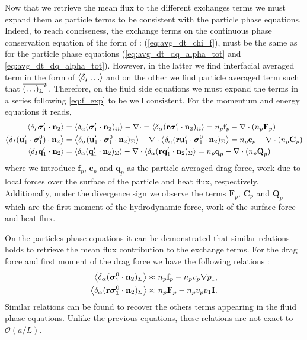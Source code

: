 Now that we retrieve the mean flux to the different exchanges terms we must expand them as particle terms to be consistent with the particle phase equations. 
Indeed, to reach conciseness, the exchange terms on the continuous phase conservation equation of the form of : (\ref{eq:avg_dt_chi_f}), must be the same as for the particle phase equations (\ref{eq:avg_dt_dq_alpha_tot} and \ref{eq:avg_dt_dq_alpha_tot}). 
However, in the latter we find interfacial averaged term in the form of $\left<\delta_I \ldots\right>$ and on the other we find particle averaged term such that $\overline{( \ldots )_\Sigma}^{p}$. 
Therefore, on the fluid side equations we must expand the terms in a series following \ref{eq:f_exp} to be well consistent.
For the momentum and energy equations it reads, 
\begin{align*}
    \left<\delta_I \bm{\sigma}_1'\cdot \textbf{n}_2\right>
    &=
    \left<\delta_\alpha ( \bm{\sigma}_1'\cdot \textbf{n}_2 )_\Omega\right>
    - \mathbf{\nabla}\cdot 
    = \left<\delta_\alpha ( \textbf{r}\bm{\sigma}_1'\cdot \textbf{n}_2 )_\Omega\right>
    = 
    n_p \textbf{f}_p
    -\mathbf{\nabla}\cdot (n_p \textbf{F}_p)\\
    \left<\delta_I (\textbf{u}_1' \cdot \bm{\sigma}_1^0 )\cdot \textbf{n}_2\right>
    &=
    \left<\delta_\alpha ( \textbf{u}_1' \cdot \bm{\sigma}_1^0 \cdot \textbf{n}_2 )_\Sigma\right>
    -\mathbf{\nabla}\cdot \left<\delta_\alpha ( \textbf{r}\textbf{u}_1' \cdot \bm{\sigma}_1^0 \cdot \textbf{n}_2 )_\Sigma\right>
    = 
    n_p \textbf{c}_p
    -\mathbf{\nabla}\cdot (n_p \textbf{C}_p)\\
    \left<\delta_I \textbf{q}_1' \cdot \textbf{n}_2\right>
    &=
    \left<\delta_\alpha ( \textbf{q}_1' \cdot \textbf{n}_2 )_\Sigma\right>
    - \mathbf{\nabla}\cdot \left<\delta_\alpha ( \textbf{r}\textbf{q}_1' \cdot \textbf{n}_2 )_\Sigma\right>
    =
    n_p \textbf{q}_p
    -\mathbf{\nabla}\cdot (n_p \textbf{Q}_p)
\end{align*}
where we introduce $\textbf{f}_p$, $\textbf{c}_p$ and $\textbf{q}_p$ as the particle averaged drag force, work due to local forces over the surface of the particle and heat flux, respectively. 
Additionally, under the divergence sign we observe the terms $\textbf{F}_p$, $\textbf{C}_p$ and $\textbf{Q}_p$ which are the first moment of the hydrodynamic force, work of the surface force and heat flux. 

On the particles phase equations it can be demonstrated that similar relations holds to retrieve the mean flux contribution to the exchange terms.
For the drag force and first moment of the drag force we have the following relations :
\begin{align*}
    \left<\delta_\alpha ( \bm{\sigma}^0_1 \cdot \textbf{n}_2 )_\Sigma\right>
    \approx
    n_p \textbf{f}_p
    - n_p v_p \mathbf{\nabla} p_1,\\
    \left<\delta_\alpha ( \textbf{r}\bm{\sigma}^0_1 \cdot \textbf{n}_2 )_\Sigma\right>
    \approx
    n_p \textbf{F}_p
    - n_p v_p p_1 \textbf{I}.
\end{align*}
Similar relations can be found to recover the others terms appearing in the fluid phase equations. 
Unlike the previous equations, these relations are not exact to $\mathcal{O}(a/L)$. 


